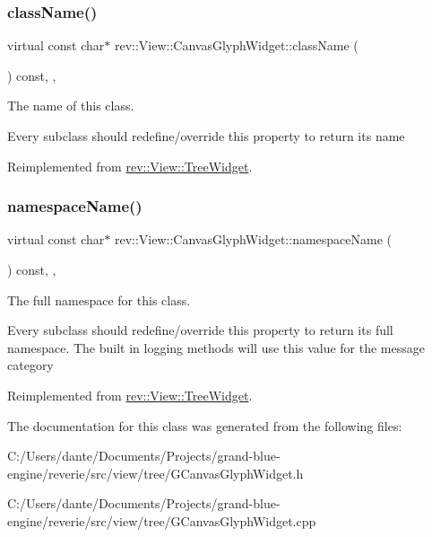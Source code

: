 \subsubsection{\texorpdfstring{className()}{className()}}
{\footnotesize\ttfamily virtual const char$\ast$ rev\+::\+View\+::\+Canvas\+Glyph\+Widget\+::class\+Name (\begin{DoxyParamCaption}{ }\end{DoxyParamCaption}) const\hspace{0.3cm}{\ttfamily [inline]}, {\ttfamily [override]}, {\ttfamily [virtual]}}



The name of this class. 

Every subclass should redefine/override this property to return its name 

Reimplemented from \mbox{\hyperlink{classrev_1_1_view_1_1_tree_widget_aedde04f44badced7c60f0e1570e3d0b2}{rev\+::\+View\+::\+Tree\+Widget}}.

\mbox{\label{classrev_1_1_view_1_1_canvas_glyph_widget_ace5c69a8e1f338fc0571f98a7329a64d}} 
\subsubsection{\texorpdfstring{namespaceName()}{namespaceName()}}
{\footnotesize\ttfamily virtual const char$\ast$ rev\+::\+View\+::\+Canvas\+Glyph\+Widget\+::namespace\+Name (\begin{DoxyParamCaption}{ }\end{DoxyParamCaption}) const\hspace{0.3cm}{\ttfamily [inline]}, {\ttfamily [override]}, {\ttfamily [virtual]}}



The full namespace for this class. 

Every subclass should redefine/override this property to return its full namespace. The built in logging methods will use this value for the message category 

Reimplemented from \mbox{\hyperlink{classrev_1_1_view_1_1_tree_widget_a09be824e34e50e9622c3dc333c9a3c07}{rev\+::\+View\+::\+Tree\+Widget}}.



The documentation for this class was generated from the following files\+:\begin{DoxyCompactItemize}
\item 
C\+:/\+Users/dante/\+Documents/\+Projects/grand-\/blue-\/engine/reverie/src/view/tree/G\+Canvas\+Glyph\+Widget.\+h\item 
C\+:/\+Users/dante/\+Documents/\+Projects/grand-\/blue-\/engine/reverie/src/view/tree/G\+Canvas\+Glyph\+Widget.\+cpp\end{DoxyCompactItemize}
